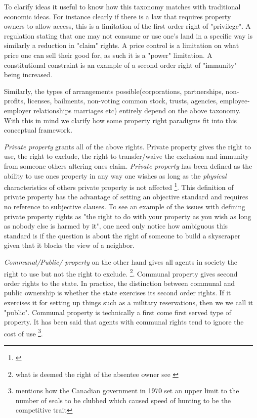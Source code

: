 \documentclass[12pt]{article}
\numberwithin{equation}{section}
\begin{document}
To clarify ideas it useful to know how this taxonomy matches with traditional economic ideas. For instance clearly if there is a law that requires property owners to allow access, this is a limitation of the first order right of "privilege". A regulation stating that one may not consume or use one's land in a specific way is similarly a reduction in "claim" rights. A price control is a limitation on what price one can sell their good for, as such it is a "power" limitation. A constitutional constraint is an example of a second order right of "immunity" being increased. 

Similarly, the types of arrangements possible(corporations, partnerships, non-profits, licenses, bailments, non-voting common stock, trusts, agencies, employee-employer relationships marriages etc) entirely depend on the above taxonomy. With this in mind we clarify how some property right paradigms fit into this conceptual framework. 

\textit{Private property} grants all of the above rights. Private property gives the right to use, the right to exclude, the right to transfer/waive the exclusion and immunity from someone others altering ones claim. \textit{Private property} has been defined as the ability to use ones property in any way one wishes as long as the \textit{physical} characteristics of others private property is not affected \footnote{\cite{Alchian1965}}. This definition of private property has the advantage of setting an objective standard and requires no reference to subjective clauses. To see an example of the issues with defining private property rights as "the right to do with your property as you wish as long as nobody else is harmed by it", one need only notice how ambiguous this standard is if the question is about the right of someone to build a skyscraper given that it blocks the view of a neighbor. 

\textit{Communal/Public/ property} on the other hand gives all agents in society the right to use but not the right to exclude. \footnote{what is deemed the right of the absentee owner see \cite{Alchian1973}}. Communal property gives second order rights to the state. In practice, the distinction between communal and public ownership is whether the state exercises its second order rights. If it exercises it for setting up things such as a military reservations, then we we call it "public". Communal property is technically a first come first served type of property. It has been said that agents with communal rights tend to ignore the cost of use \footnote{\cite{Alchian1973} mentions how the Canadian government in 1970 set an upper limit to the number of seals to be clubbed which caused speed of hunting to be the competitive trait}. 
\end{document}
